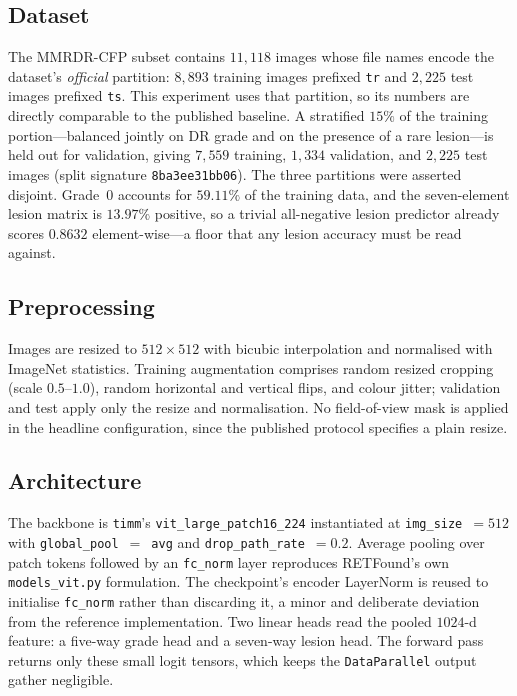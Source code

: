 \documentclass[journal,twoside,web]{ieeecolor}
\begin{document}
\subsection{Dataset}
The MMRDR-CFP subset contains $11{,}118$ images whose file names encode the dataset's
\emph{official} partition: $8{,}893$ training images prefixed \texttt{tr} and $2{,}225$
test images prefixed \texttt{ts}. This experiment uses that partition, so its numbers are
directly comparable to the published baseline. A stratified $15\%$ of the training
portion---balanced jointly on DR grade and on the presence of a rare lesion---is held out
for validation, giving $7{,}559$ training, $1{,}334$ validation, and $2{,}225$ test
images (split signature \texttt{8ba3ee31bb06}). The three partitions were asserted
disjoint. Grade~0 accounts for $59.11\%$ of the training data, and the seven-element
lesion matrix is $13.97\%$ positive, so a trivial all-negative lesion predictor already
scores $0.8632$ element-wise---a floor that any lesion accuracy must be read against.

\subsection{Preprocessing}
Images are resized to $512\times512$ with bicubic interpolation and normalised with
ImageNet statistics. Training augmentation comprises random resized cropping
(scale $0.5$--$1.0$), random horizontal and vertical flips, and colour jitter;
validation and test apply only the resize and normalisation. No field-of-view mask is
applied in the headline configuration, since the published protocol specifies a plain
resize.

\subsection{Architecture}
The backbone is \texttt{timm}'s \texttt{vit\_large\_patch16\_224} instantiated at
\texttt{img\_size}~$=512$ with \texttt{global\_pool}~$=$~\texttt{avg} and
\texttt{drop\_path\_rate}~$=0.2$. Average pooling over patch tokens followed by an
\texttt{fc\_norm} layer reproduces RETFound's own \texttt{models\_vit.py} formulation. The
checkpoint's encoder LayerNorm is reused to initialise \texttt{fc\_norm} rather than
discarding it, a minor and deliberate deviation from the reference implementation. Two
linear heads read the pooled $1024$-d feature: a five-way grade head and a seven-way
lesion head. The forward pass returns only these small logit tensors, which keeps the
\texttt{DataParallel} output gather negligible.
\end{document}
